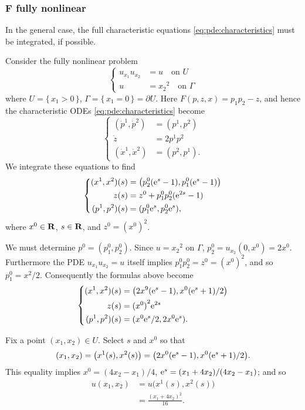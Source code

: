 \subsubsection[\(F\) fully nonlinear]{\(\bm F\) fully nonlinear}
In the general case, the full characteristic equations
\eqref{eq:pde:characteristics} must be integrated, if possible.
\begin{example}
  Consider the fully nonlinear problem
  \begin{equation}
    \label{eq:pde:nonlinear-ex-3}
    \left\{
    \begin{aligned}
      u_{x_1}u_{x_2}&=u\quad\text{on \(U\)}\\
      u&={x_2}^2\quad\text{on \(\Gamma\)}
    \end{aligned}
    \right.
  \end{equation}
  where \(U=\{\,x_1>0\,\}\), \(\Gamma=\{\,x_1=0\,\}=\partial U\). Here
  \(F(p,z,x)=p_1p_2-z\), and hence the characteristic ODEs
  \eqref{eq:pde:characteristics} become
  \[
    \left\{
    \begin{aligned}
      (\dot p^1,\dot p^2)&=(p^1,p^2)\\
      \dot z&=2p^1p^2\\
      (\dot x^1,\dot x^2)&=(p^2,p^1).
    \end{aligned}
    \right.
  \]
  We integrate these equations to find
  \[
    \left\{
    \begin{aligned}
      (x^1,x^2)(s)&=\bigl(p_2^0(\mathrm{e}^s-1),p_1^0(\mathrm{e}^s-1)\bigr)\\
      z(s)&=z^0+p_1^0p_2^0(\mathrm{e}^{2s}-1)\\
      (p^1,p^2)(s)&=(p_1^0\mathrm{e}^s,p_2^0\mathrm{e}^s),
    \end{aligned}
    \right.
  \]
  where \(x^0\in\mathbf{R}\), \(s\in\mathbf{R}\), and \(z^0={(x^0)}^2\).

  We must determine \(p^0=(p_1^0,p_2^0)\). Since \(u={x_2}^2\) on
  \(\Gamma\), \(p_2^0=u_{x_2}(0,x^0)=2x^0\). Furthermore the PDE
  \(u_{x_1}u_{x_2}=u\) itself implies \(p_1^0p_2^0=z^0={(x^0)}^2\), and so
  \(p_1^0=x^2/2\). Consequently the formulas above become
  \[
    \left\{
      \begin{aligned}
        (x^1,x^2)(s)&=\bigl(2x^9(\mathrm{e}^s-1),x^0(\mathrm{e}^s+1)/2\bigr)\\
        z(s)&={(x^0)}^2\mathrm{e}^{2s}\\
        (p^1,p^2)(s)&=(x^0\mathrm{e}^s/2,2x^0\mathrm{e}^s).
      \end{aligned}
    \right.
  \]

  Fix a point \((x_1,x_2)\in U\). Select \(s\) and \(x^0\) so that
  \[
    (x_1,x_2)=\bigl( x^1(s),x^2(s) \bigr)=\bigl(
    2x^0(\mathrm{e}^s-1),x^0(\mathrm{e}^s+1)/2 \bigr).
  \]
  This equality implies \(x^0=(4x_2-x_1)/4\),
  \(\mathrm{e}^s=(x_1+4x_2)/(4x_2-x_1)\); and so
  \begin{align*}
    u(x_1,x_2)&=u\bigl( x^1(s),x^2(s) \bigr)\\
              &=\frac{(x_1+4x_2)^2}{16}.
  \end{align*}
\end{example}

